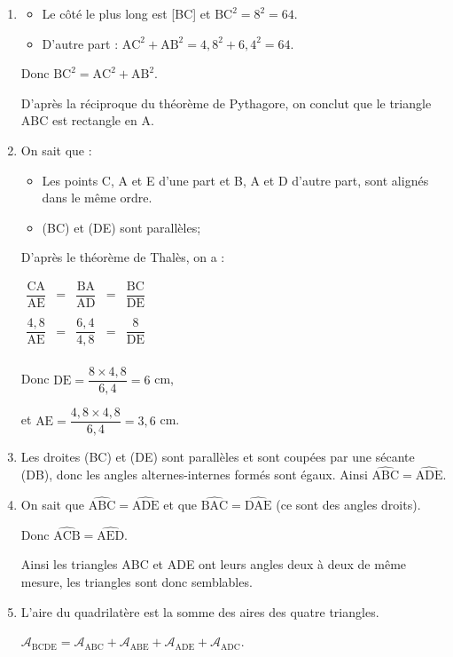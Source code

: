 \begin{enumerate}
	\item 	\begin{itemize}[label =$\bullet$]
				\item Le côté le plus long est [BC] et $\text{BC}^2=8^2=64$.
				\item D'autre part : $\text{AC}^2+\text{AB}^2=4,8^2+6,4^2=64$.
		\end{itemize}
		Donc $\text{BC}^2=\text{AC}^2+\text{AB}^2$.

		D'après la réciproque du théorème de Pythagore, on conclut que le triangle ABC est rectangle en A.
		\item On sait que :
		\begin{itemize}[label =$\bullet$]
			\item Les points C, A et E d'une part et B, A et D d'autre part, sont alignés dans le même ordre.
				\item (BC) et (DE) sont parallèles;
		\end{itemize}
		D'après le théorème de Thalès, on a :

		\(\begin{array}{ccccc}
		\dfrac{\text{CA}}{\text{AE}}&=&\dfrac{\text{BA}}{\text{AD}}&=&\dfrac{\text{BC}}{\text{DE}}\\
		 & & & & \\
		\dfrac{4,8}{\text{AE}}&=&\dfrac{6,4}{4,8}&=&\dfrac{8}{\text{DE}}\\
		\end{array}\)

		Donc $\text{DE}=\dfrac{8\times 4,8}{6,4}=6$ cm,

		et $\text{AE}=\dfrac{4,8\times 4,8}{6,4}=3,6$ cm.
		\item Les droites (BC) et (DE) sont parallèles et sont coupées par une sécante (DB), donc les angles alternes-internes formés sont égaux. Ainsi $\widehat{\text{ABC}}=\widehat{\text{ADE}}$.
		\item On sait que $\widehat{\text{ABC}}=\widehat{\text{ADE}}$ et que $\widehat{\text{BAC}}=\widehat{\text{DAE}}$ (ce sont des angles droits).

		Donc $\widehat{\text{ACB}}=\widehat{\text{AED}}$.

		Ainsi les triangles ABC et ADE ont leurs angles deux à deux de même mesure, les triangles sont donc semblables.
		\item
		L'aire du quadrilatère est la somme des aires des quatre triangles.

		 $\mathcal{A}_{\text{BCDE}}=\mathcal{A}_{\text{ABC}}+\mathcal{A}_{\text{ABE}}+\mathcal{A}_{\text{ADE}}+\mathcal{A}_{\text{ADC}}$.


\end{enumerate}
